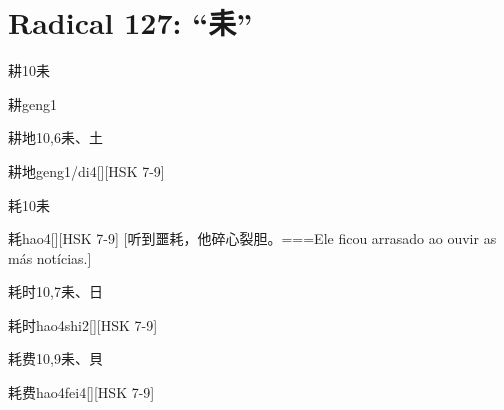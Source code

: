 
\section*{Radical 127: ``⽾''}

\begin{Entry}{耕}{10}{⽾}
  \begin{Phonetics}{耕}{geng1}
  \end{Phonetics}
\end{Entry}

\begin{Entry}{耕地}{10,6}{⽾、⼟}
  \begin{Phonetics}{耕地}{geng1/di4}[][HSK 7-9]
  \end{Phonetics}
\end{Entry}

\begin{Entry}{耗}{10}{⽾}
  \begin{Phonetics}{耗}{hao4}[][HSK 7-9]
    [听到噩耗，他碎心裂胆。===Ele ficou arrasado ao ouvir as más notícias.]
  \end{Phonetics}
\end{Entry}

\begin{Entry}{耗时}{10,7}{⽾、⽇}
  \begin{Phonetics}{耗时}{hao4shi2}[][HSK 7-9]
  \end{Phonetics}
\end{Entry}

\begin{Entry}{耗费}{10,9}{⽾、⾙}
  \begin{Phonetics}{耗费}{hao4fei4}[][HSK 7-9]
  \end{Phonetics}
\end{Entry}


